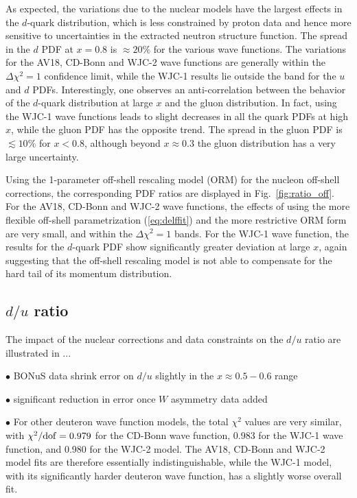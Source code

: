 \documentclass[aps,prd,amsmath,preprint]{revtex4}
\begin{document}
As expected, the variations due to the nuclear models have the
largest effects in the $d$-quark distribution, which is less
constrained by proton data and hence more sensitive to uncertainties
in the extracted neutron structure function.
The spread in the $d$ PDF at $x=0.8$ is $\approx 20\%$ for the
various wave functions.
The variations for the AV18, CD-Bonn and WJC-2 wave functions are
generally within the $\Delta\chi^2=1$ confidence limit, while the
WJC-1 results lie outside the band for the $u$ and $d$ PDFs.
Interestingly, one observes an anti-correlation between the
behavior of the $d$-quark distribution at large $x$ and the
gluon distribution.  In fact, using the WJC-1 wave functions
leads to slight decreases in all the quark PDFs at high $x$,
while the gluon PDF has the opposite trend.
The spread in the gluon PDF is $\lesssim 10\%$ for $x<0.8$,
although beyond $x \approx 0.3$ the gluon distribution has
a very large uncertainty.


Using the 1-parameter off-shell rescaling model (ORM) for the
nucleon off-shell corrections, the corresponding PDF ratios
are displayed in Fig.~\ref{fig:ratio_off}.
For the AV18, CD-Bonn and WJC-2 wave functions, the effects of
using the more flexible off-shell parametrization (\ref{eq:delffit})
and the more restrictive ORM form are very small, and within the
$\Delta\chi^2=1$ bands.
For the WJC-1 wave function, the results for the $d$-quark PDF
show significantly greater deviation at large $x$, again
suggesting that the off-shell rescaling model is not able to
compensate for the hard tail of its momentum distribution.



\subsection{$d/u$ ratio}
\label{ssec:du}

The impact of the nuclear corrections and data constraints on
the $d/u$ ratio are illustrated in ...

$\bullet$
BONuS data shrink error on $d/u$ slightly in the
$x \approx 0.5-0.6$ range


$\bullet$
significant reduction in error once $W$ asymmetry data added


$\bullet$
For other deuteron wave function models, the total $\chi^2$ values
are very similar, with
$\chi^2/{\rm dof} = 0.979$ for the CD-Bonn wave function,
0.983 for the WJC-1 wave function, and
0.980 for the WJC-2 model.
The AV18, CD-Bonn and WJC-2 model fits are therefore essentially
indistinguishable, while the WJC-1 model, with its significantly
harder deuteron wave function, has a slightly worse overall fit.
\end{document}
